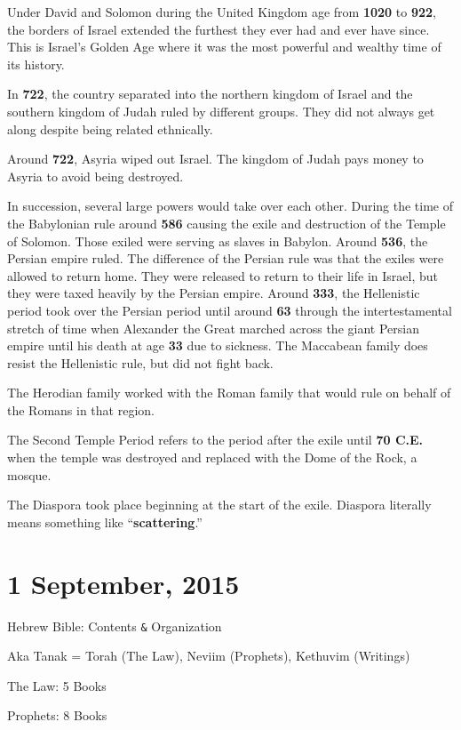 \documentclass{article}
\begin{document}
    Under David and Solomon during the United Kingdom age from \textbf{1020} to \textbf{922}, the borders of Israel extended the furthest they ever had and ever have since. This is Israel's Golden Age where it was the most powerful and wealthy time of its history.

    In \textbf{722}, the country separated into the northern kingdom of Israel and the southern kingdom of Judah ruled by different groups. They did not always get along despite being related ethnically.

    Around \textbf{722}, Asyria wiped out Israel. The kingdom of Judah pays money to Asyria to avoid being destroyed.

    In succession, several large powers would take over each other. During the time of the Babylonian rule around \textbf{586} causing the exile and destruction of the Temple of Solomon. Those exiled were serving as slaves in Babylon. Around \textbf{536}, the Persian empire ruled. The difference of the Persian rule was that the exiles were allowed to return home. They were released to return to their life in Israel, but they were taxed heavily by the Persian empire. Around \textbf{333}, the Hellenistic period took
    over the Persian period until around \textbf{63} through the intertestamental stretch of time when Alexander the Great marched across the giant Persian empire until his death at age \textbf{33} due to sickness.
    The Maccabean family does resist the Hellenistic rule, but did not fight back.

    The Herodian family worked with the Roman family that would rule on behalf of the Romans in that region.

    The Second Temple Period refers to the period after the exile until \textbf{70 C.E.} when the temple was destroyed and replaced with the Dome of the Rock, a mosque.

    The Diaspora took place beginning at the start of the exile. Diaspora literally means something like ``\textbf{scattering}.''

\section{1 September, 2015}
\centerline{Hebrew Bible: Contents \texttt{\&} Organization}

    Aka Tanak = Torah (The Law), Neviim (Prophets), Kethuvim (Writings)

    The Law: 5 Books

    Prophets: 8 Books
\end{document}
